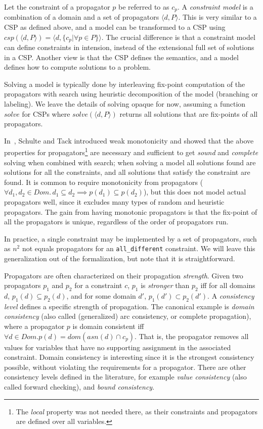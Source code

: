 \documentclass[runningheads]{llncs}
\newcommand{\cons}[1]{\texttt{#1}}
\newcommand{\Dom}{\ensuremath{\mathit{Dom}}}
\newcommand{\solve}{\ensuremath{\mathit{solve}}}
\begin{document}
Let the constraint of a propagator $p$ be referred to as $c_p$. A 
\emph{constraint model} is a combination of a domain and a set of propagators
$\langle d, P \rangle$. This is very similar to a CSP as defined
above, and a model can be transformed to a CSP using
$csp(\langle d, P\rangle)=\langle d, \{c_p |\forall p \in P\}\rangle$. The crucial
difference is that a constraint model can define constraints in
intension, instead of the extensional full set of solutions in a
CSP. Another view is that the CSP defines the semantics, and a model
defines how to compute solutions to a problem.

Solving a model is typically done by interleaving fix-point
computation of the propagators with search using heuristic
decomposition of the model (branching or labeling). We leave the
details of solving opaque for now, assuming a function $\solve$ for
CSPs where $solve(\langle d, P\rangle)$ returns all solutions that are
fix-points of all propagators.

In~\cite{SchulteTack:CP:2009}, Schulte and Tack introduced weak
monotonicity and showed that the above properties for
propagators\footnote{The \emph{local} property was not needed there,
  as their constraints and propagators are defined over all variables.} are
necessary and sufficient to get \emph{sound} and \emph{complete}
solving when combined with search; when solving a model all solutions
found are solutions for all the constraints, and all solutions that
satisfy the constraint are found. It is common to require monotonicity
from propagators ($\forall d_1,d_2\in\Dom.\, d_1\subseteq d_2\implies
p(d_1)\subseteq p(d_2)$), but this does not model actual propagators
well, since it excludes many types of random and heuristic
propagators. The gain from having monotonic propagators is that the
fix-point of all the propagators is unique, regardless of the order of
propagators run.

In practice, a single constraint may be implemented by a set of
propagators, such as $n^2$ not equals propagators for an
\cons{all\_different} constraint. We will leave this generalization out
of the formalization, but note that it is straightforward.

Propagators are often characterized on their propagation
\emph{strength}.  Given two propagators $p_1$ and $p_2$ for a
constraint $c$, $p_1$ is \emph{stronger} than $p_2$ iff for all
domains $d$, $p_1(d)\subseteq p_2(d)$, and for some domain $d'$,
$p_1(d')\subset p_2(d')$. A \emph{consistency level} defines a
specific strength of propagation. The canonical example is
\emph{domain consistency} (also called (generalized) arc consistency,
or complete propagation), where a propagator $p$ is domain consistent
iff $\forall d\in \Dom. p(d) = dom(asn(d) \cap c_p)$. That is, the
propagator removes all values for variables that have no supporting
assignment in the associated constraint. Domain consistency is
interesting since it is the strongest consistency possible, without
violating the requirements for a propagator.  There are other
consistency levels defined in the literature, for example \emph{value
consistency} (also called forward checking), and \emph{bound
consistency}.
\end{document}
